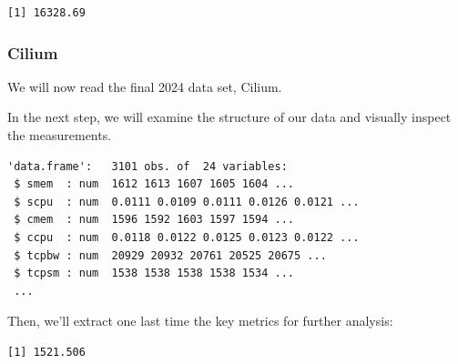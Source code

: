 \begin{verbatim}
[1] 16328.69
\end{verbatim}

\subsubsection{Cilium}

We will now read the final 2024 data set, Cilium.

\begin{Shaded}
\begin{Highlighting}[]
\OtherTok{\textless{}{-}} 
\OtherTok{\textless{}{-}} \NormalTok{(}\NormalTok{,}\NormalTok{))}
\end{Highlighting}
\end{Shaded}

In the next step, we will examine the structure of our data and visually
inspect the measurements.

\begin{Shaded}
\begin{Highlighting}[]
\end{Highlighting}
\end{Shaded}

\begin{verbatim}
'data.frame':   3101 obs. of  24 variables:
 $ smem  : num  1612 1613 1607 1605 1604 ...
 $ scpu  : num  0.0111 0.0109 0.0111 0.0126 0.0121 ...
 $ cmem  : num  1596 1592 1603 1597 1594 ...
 $ ccpu  : num  0.0118 0.0122 0.0125 0.0123 0.0122 ...
 $ tcpbw : num  20929 20932 20761 20525 20675 ...
 $ tcpsm : num  1538 1538 1538 1538 1534 ...
 ...
\end{verbatim}

Then, we'll extract one last time the key metrics for further analysis:

\begin{Shaded}
\begin{Highlighting}[]
\SpecialCharTok{\$}
\end{Highlighting}
\end{Shaded}

\begin{verbatim}
[1] 1521.506
\end{verbatim}

\begin{Shaded}
\begin{Highlighting}[]
\SpecialCharTok{\$}
\end{Highlighting}
\end{Shaded}

